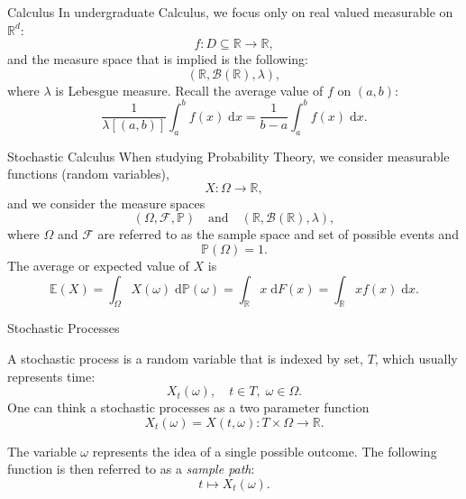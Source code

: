 \documentclass{beamer}%
\numberwithin{equation}{section}
\newcommand{\R}{\mathbb{R}}
\newcommand{\ud}{\ensuremath{\mathrm{d} }}
\begin{document}
\setcounter{page}{1}

\begin{frame}[t]{Calculus}
In undergraduate Calculus, we focus only on real valued measurable on $\R^d$:
	\[
		f : D \subseteq \R \to \R,
	\]
and the measure space that is implied is the following:
	\[
		(\R, \mathscr{B}(\R), \lambda),
	\]
where $\lambda$ is Lebesgue measure. Recall the average value of $f$ on $(a,b)$:
	\[
		\frac{1}{\lambda[(a,b)]} \int_a^b f(x) \; \ud x = \frac{1}{b-a} \int_a^b f(x) \; \ud x.
	\]
	\end{frame}

\begin{frame}[t]{Stochastic Calculus}
When studying Probability Theory, we consider measurable functions (random variables),
	\[
		X : \Omega \to \R,
	\]
and we consider the measure spaces
	\[
		(\Omega, \mathcal{F}, \mathbb{P}) \quad \text{and} \quad (\R, \mathscr{B}(\R), \lambda),
	\]
where $\Omega$ and $\mathcal{F}$ are referred to as the sample space and set of possible events and
	\[
		\mathbb{P}(\Omega) = 1.
	\]
%
The average or expected value of $X$ is
	\[
		\mathbb{E}(X) = \int_{\Omega} X(\omega) \; \ud\mathbb{P}(\omega) = \int_{\R} x \;\ud F(x) = \int_{\R} x f(x) \;\ud x.
	\]
	\end{frame}

\begin{frame}{Stochastic Processes}
	\begin{definition}
A stochastic process is a random variable that is indexed by set, $T$, which usually represents time:
	\[
		X_t(\omega), \quad t \in T, \; \omega \in \Omega.
	\]
One can think a stochastic processes as a two parameter function
	\[
		X_t(\omega) = X(t,\omega): T \times \Omega \to \R.
	\]
	\end{definition}
  \pause

	\begin{definition}
The variable $\omega$ represents the idea of a single possible outcome. The following function is then referred to as a {\it sample path}:
	\[
		t \mapsto X_t(\omega).
	\]
	\end{definition}

\end{frame}
\end{document}
